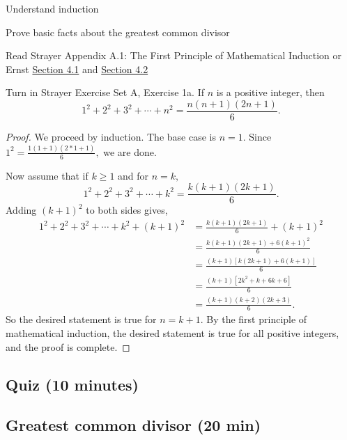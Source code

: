 \documentclass{ximera}
\begin{document}
\begin{obj}
\item  Understand induction
\item Prove basic facts about the greatest common divisor
\end{obj}

\begin{pre}
 \item[Read] Strayer Appendix A.1: The First Principle of Mathematical Induction  or Ernst \href{https://danaernst.com/IBL-IntroToProof/pretext/sec_Intro_to_Induction.html}{Section 4.1} and \href{https://danaernst.com/IBL-IntroToProof/pretext/sec_More_on_Induction.html}{Section 4.2}
 
 \item[Turn in] Strayer Exercise Set A, Exercise 1a. If $n$ is a positive integer, then 
 \[1^2+2^2+3^2+\cdots+n^2=\frac{n(n+1)(2n+1)}{6}.\]
 
\begin{proof}
 We proceed by induction. The base case is $n=1$. Since $1^2=\frac{1(1+1)(2*1+1)}{6},$ we are done.
 
 Now assume that if $k \geq 1$ and for $n = k,$  \[1^2+2^2+3^2+\cdots+k^2=\frac{k(k+1)(2k+1)}{6}.\]
 Adding $(k+1)^2$ to both sides gives, 
 \begin{align*}
 1^2+2^2+3^2+\cdots+k^2+(k+1)^2&=\frac{k(k+1)(2k+1)}{6}+(k+1)^2\\
 &=\frac{k(k+1)(2k+1)+6(k+1)^2}{6}\\
 &=\frac{(k+1)[k(2k+1)+6(k+1)]}{6}\\
 &=\frac{(k+1)[2k^2+k+6k+6]}{6}
 \\
 &=\frac{(k+1)(k+2)(2k+3)}{6}.\end{align*}
 So the desired statement is true for $n = k + 1$. By the first principle of mathematical induction, the desired statement is true for all positive integers, and the proof is complete.
\end{proof}
\end{pre}


\subsection{Quiz (10 minutes)}
\subsection{Greatest common divisor (20 min)} 
\end{document}
